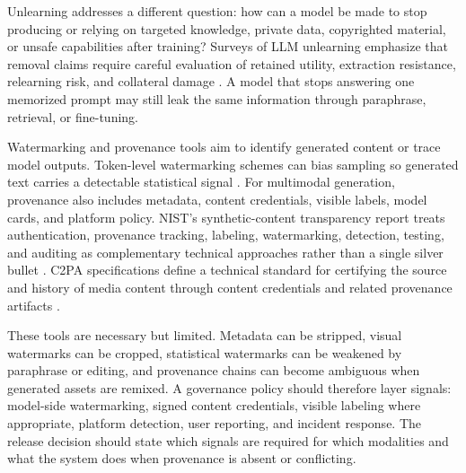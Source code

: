 Unlearning addresses a different question: how can a model be made to stop producing or relying on targeted knowledge, private data, copyrighted material, or unsafe capabilities after training? Surveys of LLM unlearning emphasize that removal claims require careful evaluation of retained utility, extraction resistance, relearning risk, and collateral damage \cite{qiu2025unlearning}. A model that stops answering one memorized prompt may still leak the same information through paraphrase, retrieval, or fine-tuning.

Watermarking and provenance tools aim to identify generated content or trace model outputs. Token-level watermarking schemes can bias sampling so generated text carries a detectable statistical signal \cite{kirchenbauer2023watermark}. For multimodal generation, provenance also includes metadata, content credentials, visible labels, model cards, and platform policy. NIST's synthetic-content transparency report treats authentication, provenance tracking, labeling, watermarking, detection, testing, and auditing as complementary technical approaches rather than a single silver bullet \cite{nist2024syntheticcontent}. C2PA specifications define a technical standard for certifying the source and history of media content through content credentials and related provenance artifacts \cite{c2pa2026spec}.

These tools are necessary but limited. Metadata can be stripped, visual watermarks can be cropped, statistical watermarks can be weakened by paraphrase or editing, and provenance chains can become ambiguous when generated assets are remixed. A governance policy should therefore layer signals: model-side watermarking, signed content credentials, visible labeling where appropriate, platform detection, user reporting, and incident response. The release decision should state which signals are required for which modalities and what the system does when provenance is absent or conflicting.


